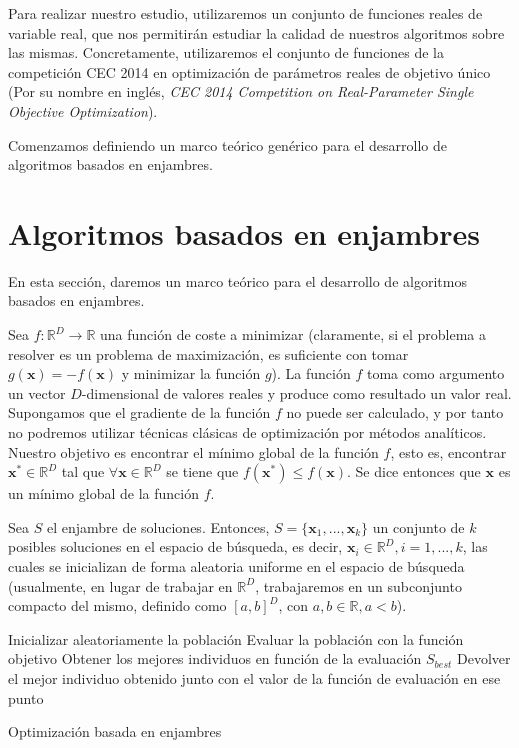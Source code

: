 \documentclass[
  a4paper,
,tablecaptionabove
]{scrartcl}
\begin{document}
Para realizar nuestro estudio, utilizaremos un conjunto de funciones
reales de variable real, que nos permitirán estudiar la calidad de
nuestros algoritmos sobre las mismas. Concretamente, utilizaremos el
conjunto de funciones de la competición CEC 2014 en optimización de
parámetros reales de objetivo único (Por su nombre en inglés, \emph{CEC
2014 Competition on Real-Parameter Single Objective Optimization}).

Comenzamos definiendo un marco teórico genérico para el desarrollo de
algoritmos basados en enjambres.

\hypertarget{algoritmos-basados-en-enjambres}{%
\section{Algoritmos basados en
enjambres}\label{algoritmos-basados-en-enjambres}}

En esta sección, daremos un marco teórico para el desarrollo de
algoritmos basados en enjambres.

Sea \(f: \mathbb{R}^D \to \mathbb{R}\) una función de coste a minimizar
(claramente, si el problema a resolver es un problema de maximización,
es suficiente con tomar \(g(\mathbf{x}) = - f(\mathbf{x})\) y minimizar
la función \(g\)). La función \(f\) toma como argumento un vector
\(D\)-dimensional de valores reales y produce como resultado un valor
real. Supongamos que el gradiente de la función \(f\) no puede ser
calculado, y por tanto no podremos utilizar técnicas clásicas de
optimización por métodos analíticos. Nuestro objetivo es encontrar el
mínimo global de la función \(f\), esto es, encontrar
\(\mathbf{x}^* \in \mathbb{R}^D\) tal que
\(\forall \mathbf{x} \in \mathbb{R}^D\) se tiene que
\(f(\mathbf{x}^*) \leq f(\mathbf{x})\). Se dice entonces que
\(\mathbf{x}\) es un mínimo global de la función \(f\).

Sea \(S\) el enjambre de soluciones. Entonces,
\(S = \{\mathbf{x}_1, ..., \mathbf{x}_k\}\) un conjunto de \(k\)
posibles soluciones en el espacio de búsqueda, es decir,
\(\mathbf{x}_i \in \mathbb{R}^D, i=1,...,k\), las cuales se inicializan
de forma aleatoria uniforme en el espacio de búsqueda (usualmente, en
lugar de trabajar en \(\mathbb{R}^D\), trabajaremos en un subconjunto
compacto del mismo, definido como \([a, b]^D\), con
\(a, b \in \mathbb{R}, a < b\)).

\begin{algorithm}[H]
\DontPrintSemicolon
\SetAlgoLined

\BlankLine
    Inicializar aleatoriamente la población\;
    Evaluar la población con la función objetivo\;
    Obtener los mejores individuos en función de la evaluación $S_{best}$\;
    Devolver el mejor individuo obtenido junto con el valor de la función de evaluación en ese punto\;
\caption{Optimización basada en enjambres}
\end{algorithm}
\end{document}
